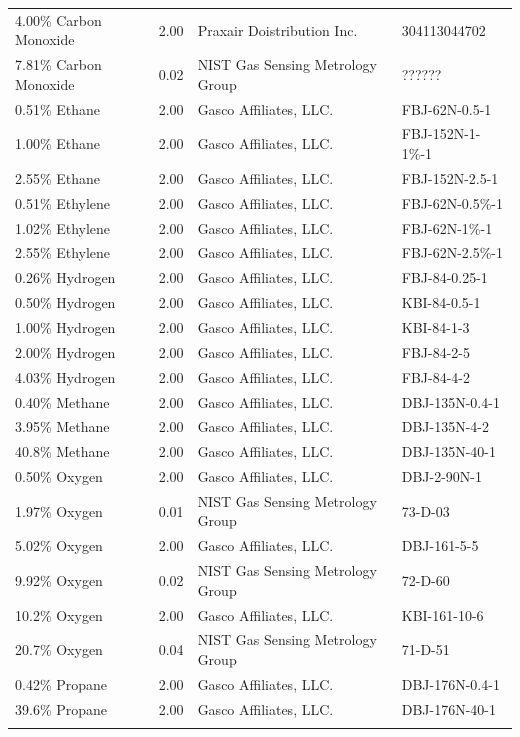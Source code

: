 \documentclass[12pt]{article}
\begin{document}
\begin{table}[h!]
\begin{tabular}{lcll}
4.00\% Carbon Monoxide	&	2.00	&	Praxair Doistribution Inc. 	&	304113044702		\\
7.81\% Carbon Monoxide	&	0.02	&	NIST Gas Sensing Metrology Group 		&	??????		\\
0.51\% Ethane		&	2.00	&	Gasco Affiliates, LLC.		&	FBJ-62N-0.5-1		\\
1.00\% Ethane		&	2.00	&	Gasco Affiliates, LLC.		&	FBJ-152N-1-1\%-1		\\
2.55\% Ethane		&	2.00	&	Gasco Affiliates, LLC.		&	FBJ-152N-2.5-1		\\
0.51\% Ethylene		&	2.00	&	Gasco Affiliates, LLC.		&	FBJ-62N-0.5\%-1		\\
1.02\% Ethylene		&	2.00	&	Gasco Affiliates, LLC.		&	FBJ-62N-1\%-1		\\
2.55\% Ethylene		&	2.00	&	Gasco Affiliates, LLC.		&	FBJ-62N-2.5\%-1		\\
0.26\% Hydrogen		&	2.00	&	Gasco Affiliates, LLC.		&	FBJ-84-0.25-1		\\
0.50\% Hydrogen		&	2.00	&	Gasco Affiliates, LLC.		&	KBI-84-0.5-1		\\
1.00\% Hydrogen		&	2.00	&	Gasco Affiliates, LLC.		&	KBI-84-1-3		\\
2.00\% Hydrogen		&	2.00	&	Gasco Affiliates, LLC.		&	FBJ-84-2-5		\\
4.03\% Hydrogen		&	2.00	&	Gasco Affiliates, LLC.		&	FBJ-84-4-2		\\
0.40\% Methane		&	2.00	&	Gasco Affiliates, LLC. 		&	DBJ-135N-0.4-1		\\
3.95\% Methane		&	2.00	&	Gasco Affiliates, LLC.		&	DBJ-135N-4-2		\\
40.8\% Methane		&	2.00	&	Gasco Affiliates, LLC.		&	DBJ-135N-40-1		\\
0.50\% Oxygen		&	2.00	&	Gasco Affiliates, LLC. 		&	DBJ-2-90N-1		\\
1.97\% Oxygen		&	0.01	&	NIST Gas Sensing Metrology Group		&	73-D-03		\\
5.02\% Oxygen		&	2.00	&	Gasco Affiliates, LLC.		&	DBJ-161-5-5		\\
9.92\% Oxygen		&	0.02	&	NIST Gas Sensing Metrology Group		&	72-D-60		\\
10.2\% Oxygen		&	2.00	&	Gasco Affiliates, LLC. 		&	KBI-161-10-6		\\
20.7\% Oxygen		&	0.04	&	NIST Gas Sensing Metrology Group		&	71-D-51		\\
0.42\% Propane		&	2.00	&	Gasco Affiliates, LLC.		&	DBJ-176N-0.4-1		\\
39.6\% Propane		&	2.00	&	Gasco Affiliates, LLC. 		&	DBJ-176N-40-1		\\
\\[0.005cm]
\hline
\end{tabular}
\end{table}
\end{document}
